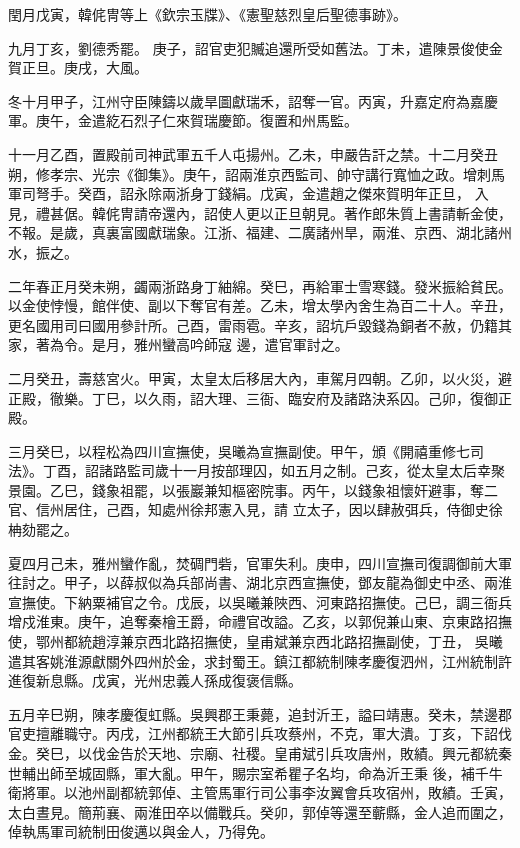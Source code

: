 \begin{pinyinscope}
 閏月戊寅，韓侂冑等上《欽宗玉牒》、《憲聖慈烈皇后聖德事跡》。



 九月丁亥，劉德秀罷。
 庚子，詔官吏犯贓追還所受如舊法。丁未，遣陳景俊使金賀正旦。庚戌，大風。



 冬十月甲子，江州守臣陳鑄以歲旱圖獻瑞禾，詔奪一官。丙寅，升嘉定府為嘉慶軍。庚午，金遣紇石烈子仁來賀瑞慶節。復置和州馬監。



 十一月乙酉，置殿前司神武軍五千人屯揚州。乙未，申嚴告訐之禁。十二月癸丑朔，修孝宗、光宗《御集》。庚午，詔兩淮京西監司、帥守講行寬恤之政。增刺馬軍司弩手。癸酉，詔永除兩浙身丁錢絹。戊寅，金遣趙之傑來賀明年正旦，
 入見，禮甚倨。韓侂冑請帝還內，詔使人更以正旦朝見。著作郎朱質上書請斬金使，不報。是歲，真裏富國獻瑞象。江浙、福建、二廣諸州旱，兩淮、京西、湖北諸州水，振之。



 二年春正月癸未朔，蠲兩浙路身丁紬綿。癸巳，再給軍士雪寒錢。發米振給貧民。以金使悖慢，館伴使、副以下奪官有差。乙未，增太學內舍生為百二十人。辛丑，更名國用司曰國用參計所。己酉，雷雨雹。辛亥，詔坑戶毀錢為銅者不赦，仍籍其家，著為令。是月，雅州蠻高吟師寇
 邊，遣官軍討之。



 二月癸丑，壽慈宮火。甲寅，太皇太后移居大內，車駕月四朝。乙卯，以火災，避正殿，徹樂。丁巳，以久雨，詔大理、三衙、臨安府及諸路決系囚。己卯，復御正殿。



 三月癸巳，以程松為四川宣撫使，吳曦為宣撫副使。甲午，頒《開禧重修七司法》。丁酉，詔諸路監司歲十一月按部理囚，如五月之制。己亥，從太皇太后幸聚景園。乙巳，錢象祖罷，以張巖兼知樞密院事。丙午，以錢象祖懷奸避事，奪二官、信州居住，己酉，知處州徐邦憲入見，請
 立太子，因以肆赦弭兵，侍御史徐柟劾罷之。



 夏四月己未，雅州蠻作亂，焚碉門砦，官軍失利。庚申，四川宣撫司復調御前大軍往討之。甲子，以薛叔似為兵部尚書、湖北京西宣撫使，鄧友龍為御史中丞、兩淮宣撫使。下納粟補官之令。戊辰，以吳曦兼陜西、河東路招撫使。己巳，調三衙兵增戍淮東。庚午，追奪秦檜王爵，命禮官改謚。乙亥，以郭倪兼山東、京東路招撫使，鄂州都統趙淳兼京西北路招撫使，皇甫斌兼京西北路招撫副使，丁丑，
 吳曦遣其客姚淮源獻關外四州於金，求封蜀王。鎮江都統制陳孝慶復泗州，江州統制許進復新息縣。戊寅，光州忠義人孫成復褒信縣。



 五月辛巳朔，陳孝慶復虹縣。吳興郡王秉薨，追封沂王，謚曰靖惠。癸未，禁邊郡官吏擅離職守。丙戌，江州都統王大節引兵攻蔡州，不克，軍大潰。丁亥，下詔伐金。癸巳，以伐金告於天地、宗廟、社稷。皇甫斌引兵攻唐州，敗績。興元都統秦世輔出師至城固縣，軍大亂。甲午，賜宗室希瞿子名均，命為沂王秉
 後，補千牛衛將軍。以池州副都統郭倬、主管馬軍行司公事李汝翼會兵攻宿州，敗績。壬寅，太白晝見。簡荊襄、兩淮田卒以備戰兵。癸卯，郭倬等還至蘄縣，金人追而圍之，倬執馬軍司統制田俊邁以與金人，乃得免。




\end{pinyinscope}
